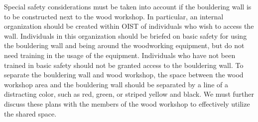 Special safety considerations must be taken into account if the bouldering wall is to be constructed next to the wood workshop. In particular, an internal organization should be created within OIST of individuals who wish to access the wall. Individuals in this organization should be briefed on basic safety for using the bouldering wall and being around the woodworking equipment, but do not need training in the usage of the equipment. Individuals who have not been trained in basic safety should not be granted access to the bouldering wall. To separate the bouldering wall and wood workshop, the space  between the wood workshop area and the bouldering wall should be separated by a line of a distracting color, such as red, green, or striped yellow and black. We must further discuss these plans with the members of the wood workshop to effectively utilize the shared space.

